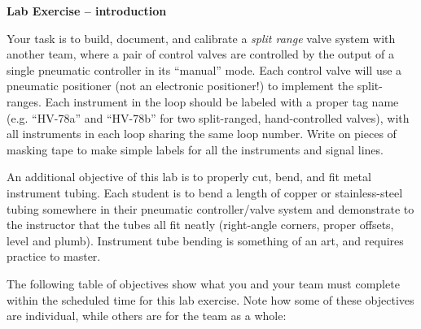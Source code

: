

\noindent
{\bf Lab Exercise -- introduction}

\vskip 5pt

Your task is to build, document, and calibrate a {\it split range} valve system with another team, where a pair of control valves are controlled by the output of a single pneumatic controller in its ``manual'' mode.  Each control valve will use a pneumatic positioner (not an electronic positioner!) to implement the split-ranges.  Each instrument in the loop should be labeled with a proper tag name (e.g. ``HV-78a'' and ``HV-78b'' for two split-ranged, hand-controlled valves), with all instruments in each loop sharing the same loop number.  Write on pieces of masking tape to make simple labels for all the instruments and signal lines.

An additional objective of this lab is to properly cut, bend, and fit metal instrument tubing.  Each student is to bend a length of copper or stainless-steel tubing somewhere in their pneumatic controller/valve system and demonstrate to the instructor that the tubes all fit neatly (right-angle corners, proper offsets, level and plumb).  Instrument tube bending is something of an art, and requires practice to master.

The following table of objectives show what you and your team must complete within the scheduled time for this lab exercise.  Note how some of these objectives are individual, while others are for the team as a whole:



